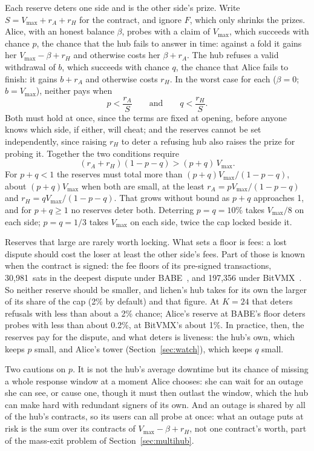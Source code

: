 \documentclass[11pt]{article}
\newcommand{\vmax}{V_{\max}}
\begin{document}
Each reserve deters one side and is the other side's prize. Write
$S = \vmax + r_A + r_H$ for the contract, and ignore $F$, which only
shrinks the prizes. Alice, with an honest balance $\beta$, probes with a
claim of $\vmax$, which succeeds with chance $p$, the chance that the hub
fails to answer in time: against a fold it gains her
$\vmax - \beta + r_H$ and otherwise costs her $\beta + r_A$. The hub
refuses a valid withdrawal of $b$, which succeeds with chance $q$, the
chance that Alice fails to finish: it gains $b + r_A$ and otherwise
costs $r_H$. In the worst case for each ($\beta = 0$; $b = \vmax$),
neither pays when
\[
  p < \frac{r_A}{S} \qquad\text{and}\qquad q < \frac{r_H}{S}.
\]
Both must hold at once, since the terms are fixed at opening, before
anyone knows which side, if either, will cheat; and the reserves cannot
be set independently, since raising $r_H$ to deter a refusing hub also
raises the prize for probing it. Together the two conditions require
\[
  (r_A + r_H)(1 - p - q) > (p + q)\,\vmax .
\]
For $p + q < 1$ the reserves must total more than
$(p + q)\vmax / (1 - p - q)$, about $(p + q)\vmax$ when both are small,
at the least $r_A = p\vmax/(1 - p - q)$ and $r_H = q\vmax/(1 - p - q)$.
That grows without bound as $p + q$ approaches 1, and for $p + q \ge 1$
no reserves deter both. Deterring $p = q = 10\%$ takes $\vmax/8$ on each
side; $p = q = 1/3$ takes $\vmax$ on each side, twice the cap locked
beside it.

Reserves that large are rarely worth locking. What sets a floor is fees:
a lost dispute should cost the loser at least the other side's fees.
Part of those is known when the contract is signed: the fee floors of
its pre-signed transactions, 30,981~sats in the deepest dispute under
BABE~\cite[\S 8]{lichenbabe}, and 197,356 under
BitVMX~\cite[\S 6]{lichenbitvmx}. So neither reserve should be smaller,
and lichen's hub takes for its own the larger of its share of the cap
(2\% by default) and that figure. At $K = 24$ that deters refusals with
less than about a 2\% chance; Alice's reserve at BABE's floor deters
probes with less than about 0.2\%, at BitVMX's about 1\%. In practice, then, the reserves pay
for the dispute, and what deters is liveness: the hub's own, which keeps
$p$ small, and Alice's tower (Section~\ref{sec:watch}), which keeps $q$
small.

Two cautions on $p$. It is not the hub's average downtime but its
chance of missing a whole response window at a moment Alice chooses:
she can wait for an outage she can see, or cause one, though it must
then outlast the window, which the hub can make hard with redundant
signers of its own. And an outage is shared by all of the hub's
contracts, so its users can all probe at once: what an outage puts at
risk is the sum over its contracts of $\vmax - \beta + r_H$, not one
contract's worth, part of the mass-exit problem of
Section~\ref{sec:multihub}.
\end{document}
